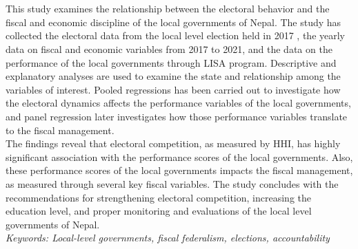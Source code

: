 \section*{}
\vspace{-10mm}
This study examines the relationship between the electoral behavior and the fiscal and economic discipline of the local governments of Nepal. The study has collected the electoral data from the local level election held in 2017 , the yearly data on fiscal and economic variables from 2017 to 2021, and the data on the performance of the local governments through LISA program. Descriptive and explanatory analyses are used to examine the state and relationship among the variables of interest. Pooled regressions has been carried out to investigate how the electoral dynamics affects the performance variables of the local governments, and panel regression later investigates how those performance variables translate to the fiscal management.\\
The findings reveal that electoral competition, as measured by HHI, has highly significant association with the performance scores of the local governments. Also, these performance scores of the local governments impacts the fiscal management, as measured through several key fiscal variables. The study concludes with the recommendations for strengthening electoral competition, increasing the education level, and proper monitoring and evaluations of the local level governments of Nepal.\\
\textit{Keywords: Local-level governments, fiscal federalism, elections, accountability}

